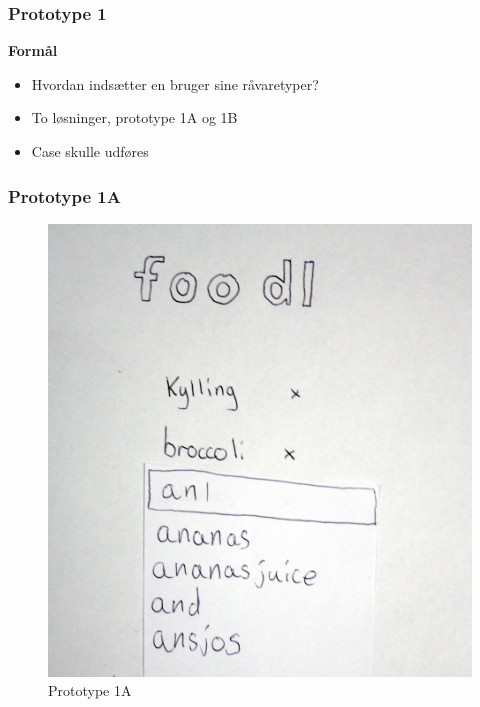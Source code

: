 \begin{frame}
\frametitle{Prototype 1}
	\textbf{Formål}
		\begin{itemize}
		\item Hvordan indsætter en bruger sine råvaretyper?
		\item To løsninger, prototype 1A og 1B
		\item Case skulle udføres
		\end{itemize}
\end{frame}


\begin{frame}
	\frametitle{Prototype 1A}
	\begin{figure}
	\centering
	\includegraphics[scale=0.08]{billeder/prototype1a.jpg}
	\caption{Prototype 1A}
	\end{figure}
\end{frame}

